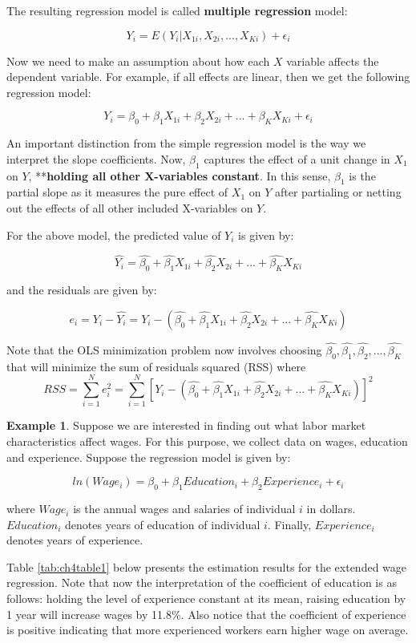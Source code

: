 \documentclass[
]{book}
\theoremstyle{definition}
\theoremstyle{definition}
\newtheorem{example}{Example}[chapter]
\theoremstyle{definition}
\theoremstyle{definition}
\theoremstyle{remark}
\begin{document}
The resulting regression model is called \textbf{multiple regression} model:

\[Y_i=E(Y_i|X_{1i},X_{2i},...,X_{Ki})+\epsilon_i\]

Now we need to make an assumption about how each \(X\) variable affects the dependent variable. For example, if all effects are linear, then we get the following regression model:

\[Y_i=\beta_0 +\beta_1X_{1i} + \beta_2 X_{2i}+...+\beta_KX_{Ki}+\epsilon_i\]

An important distinction from the simple regression model is the way we interpret the slope coefficients. Now, \(\beta_1\) captures the effect of a unit change in \(X_1\) on \(Y\), **\textbf{holding all other X-variables constant}. In this sense, \(\beta_1\) is the partial slope as it measures the pure effect of \(X_1\) on \(Y\) after partialing or netting out the effects of all other included X-variables on \(Y\).

For the above model, the predicted value of \(Y_i\) is given by:

\[\hat{Y_i}=\hat{\beta_0} +\hat{\beta_1}X_{1i} + \hat{\beta_2} X_{2i}+...+\hat{\beta_K}X_{Ki}\]

and the residuals are given by:

\[e_i = Y_i- \hat{Y_i}= Y_i - (\hat{\beta_0} +\hat{\beta_1}X_{1i} + \hat{\beta_2} X_{2i}+...+\hat{\beta_K}X_{Ki})\]

Note that the OLS minimization problem now involves choosing \(\hat{\beta_0}, \hat{\beta_1}, \hat{\beta_2},..., \hat{\beta_K}\) that will minimize the sum of residuals squared (RSS) where
\[RSS=\sum_{i=1}^N e_i^2=\sum_{i=1}^N [Y_i - (\hat{\beta_0} +\hat{\beta_1}X_{1i} + \hat{\beta_2} X_{2i}+...+\hat{\beta_K}X_{Ki})]^2 \]

\begin{example}
\protect\hypertarget{exm:unnamed-chunk-20}{}\label{exm:unnamed-chunk-20}Suppose we are interested in finding out what labor market characteristics affect wages. For this purpose, we collect data on wages, education and experience. Suppose the regression model is given by:

\[ln(Wage_i)= \beta_0 +\beta_1 Education_i + \beta_2 Experience_i + \epsilon_i\]

where \(Wage_i\) is the annual wages and salaries of individual \(i\) in dollars. \(Education_i\) denotes years of education of individual \(i\). Finally, \(Experience_i\) denotes years of experience.

Table \ref{tab:ch4table1} below presents the estimation results for the extended wage regression. Note that now the interpretation of the coefficient of education is as follows: holding the level of experience constant at its mean, raising education by 1 year will increase wages by 11.8\%. Also notice that the coefficient of experience is positive indicating that more experienced workers earn higher wage on average.
\end{example}
\end{document}
